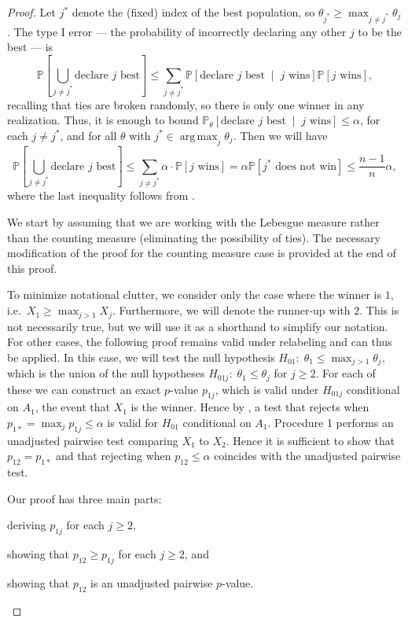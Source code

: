 \documentclass[aos, authoryear]{imsart}
\theoremstyle{definition}
\theoremstyle{custom}
\newcommand{\PP}{\mathbb{P}}
\DeclareMathOperator*{\argmax}{arg\,max}
\begin{document}
\begin{proof}
Let $j^*$ denote the (fixed) index of the best population, so $\theta_{j^*} \ge \max_{j\neq j^*} \theta_j$. The type I error --- the probability of incorrectly declaring any other $j$ to be the best --- is
\[\PP\left[\bigcup_{j \ne j^*} \text{declare } j \text{ best}\right] \le \sum_{j \ne j^*} \PP\left[\text{declare } j \text{ best} \;\middle|\; j \text{ wins}\right] \PP\left[j \text{ wins}\right],\]
recalling that ties are broken randomly, so there is only one winner in any realization. Thus, it is enough to bound $\PP_{\theta}\left[\text{declare } j \text{ best} \;\middle|\; j \text{ wins}\right] \le \alpha$, for each $j \ne j^*$, and for all $\theta$ with $j^* \in \argmax_j \theta_j$. Then we will have
\begin{equation}
\label{eq:marginal}
\PP\left[\bigcup_{j \ne j^*} \text{declare } j \text{ best}\right] \le \sum_{j \ne j^*} \alpha \cdot \PP\left[j \text{ wins}\right] = \alpha \PP\left[j^* \text{ does not win}\right] \le \frac{n-1}{n} \alpha,
\end{equation}
where the last inequality follows from .

We start by assuming that we are working with the Lebesgue measure rather than the counting measure (eliminating the possibility of ties). The necessary modification of the proof for the counting measure case is provided at the end of this proof.

To minimize notational clutter, we consider only the case where the winner is $1$, i.e.\ $X_1 \ge \max_{j > 1} X_j$. Furthermore, we will denote the runner-up with $2$. This is not necessarily true, but we will use it as a shorthand to simplify our notation. For other cases, the following proof remains valid under relabeling and can thus be applied. In this case, we will test the null hypothesis $H_{01}:\; \theta_1 \le \max_{j > 1} \theta_j$, which is the union of the null hypotheses $H_{01j}:\; \theta_1 \le \theta_j$ for $j \ge 2$. For each of these we can construct an exact $p$-value $p_{1j}$, which is valid under $H_{01j}$ conditional on $A_1$, the event that $X_1$ is the winner. Hence by , a test that rejects when $p_{1*} = \max_j p_{1j} \le \alpha$ is valid for $H_{01}$ conditional on $A_1$. Procedure 1 performs an unadjusted pairwise test comparing $X_1$ to $X_2$. Hence it is sufficient to show that $p_{12} = p_{1*}$ and that rejecting when $p_{12}\le \alpha$ coincides with the unadjusted pairwise test.

Our proof has three main parts:
\begin{inlinelist}
\item deriving $p_{1j}$ for each $j\ge 2$,
\item showing that $p_{12} \ge p_{1j}$ for each $j\ge 2$, and
\item showing that $p_{12}$ is an unadjusted pairwise $p$-value.
\end{inlinelist}


\end{proof}
\end{document}
